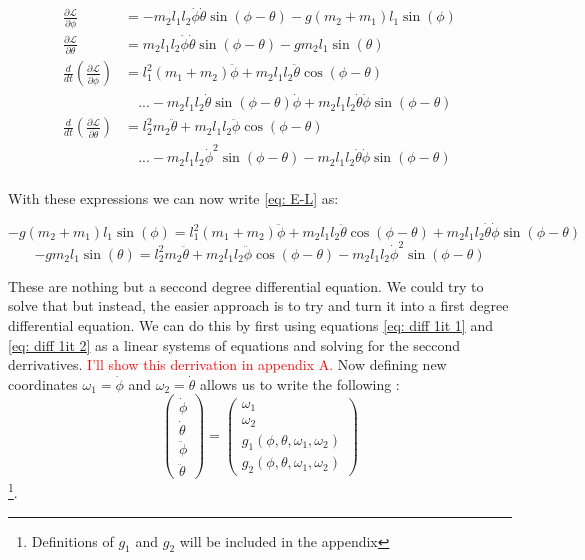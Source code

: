 \documentclass[twocolumn]{revtex4-2}
\newcommand{\Lagr}{\mathcal{L}}
\begin{document}
\begin{align*}
	\frac{\partial \Lagr}{\partial \phi} &= - m_2l_1l_2\dot \phi \dot \theta \sin{(\phi - \theta)} -
	g(m_2+m_1)l_1\sin{(\phi)} \\
	\frac{\partial \Lagr}{\partial \theta} &=  m_2l_1l_2\dot \phi \dot \theta \sin{(\phi - \theta)} -
	gm_2l_1\sin{(\theta)} \\
	\frac{d}{dt}\left(\frac{\partial \Lagr}{\partial \dot \phi} \right) &= l_1^2(m_1 +m_2)\ddot \phi +
	m_2l_1l_2\ddot \theta\cos{(\phi - \theta)}
	 \\
	& \quad ... - m_2l_1l_2\dot \theta \sin{(\phi - \theta)}\dot \phi  + m_2l_1l_2
\dot \theta \dot \phi \sin{(\phi - \theta)} \\
	\frac{d}{dt} \left( \frac{\partial \Lagr}{\partial \dot \theta} \right) &= l_2^2m_2\ddot \theta +
	m_2l_1l_2\ddot \phi\cos{(\phi - \theta)}
	 \\
	& \quad ... - m_2l_1l_2\dot \phi^{2} \sin{(\phi - \theta)}  - m_2l_1l_2
\dot \theta \dot \phi \sin{(\phi - \theta)} \\
\end{align*}

With these expressions we can now write \ref{eq: E-L} as:
\begin{widetext}
	\begin{equation}
 -g(m_2+m_1)l_1\sin{(\phi)} = 
 l_1^2(m_1 +m_2)\ddot \phi +
	m_2l_1l_2\ddot \theta\cos{(\phi - \theta)} + m_2l_1l_2
\dot \theta \dot \phi \sin{(\phi - \theta)} 
	\label{eq: diff 1it 1}
	\end{equation}
	\begin{equation}
- gm_2l_1\sin{(\theta)}  = 
 l_2^2m_2\ddot \theta +
	m_2l_1l_2\ddot \phi\cos{(\phi - \theta)}
	- m_2l_1l_2\dot \phi^{2} \sin{(\phi - \theta)} 
	\label{eq: diff 1it 2}
	\end{equation}
\end{widetext}
These are nothing but a seccond degree differential equation. We could try to solve that but instead, the easier approach is to try and turn it into a first degree differential equation. We can do this by first using equations \ref{eq: diff 1it 1} and \ref{eq: diff 1it 2} as a linear systems of equations and solving for the seccond derrivatives.\textcolor{red}{ I'll show this derrivation in appendix A.} Now defining new coordinates $\omega_1 = \dot \phi$ and $\omega_2 = \dot \theta$ allows us to write the following :
\begin{equation}
	\left(
	\begin{array}{c}
		\dot \phi \\
		\dot \theta \\
		\ddot \phi \\
		\ddot \theta
	\end{array} \right)  =
	\left(\begin{array}{c}
		\omega_1 \\
		\omega_2 \\
		g_1(\phi, \theta, \omega_1, \omega_2) \\
		g_2(\phi, \theta, \omega_1, \omega_2)
	\end{array}\right)
\end{equation}
\footnote{Definitions of $g_1$ and $g_2$ will be included in the appendix}.
\end{document}
